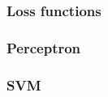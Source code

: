 \documentclass[ignorenonframetext,plain]{beamer}
\begin{document}
\begin{frame}\frametitle{Loss functions} %

\end{frame}

\begin{frame}\frametitle{Perceptron} %

\end{frame}

\begin{frame}\frametitle{SVM} %

\end{frame}
\end{document}
